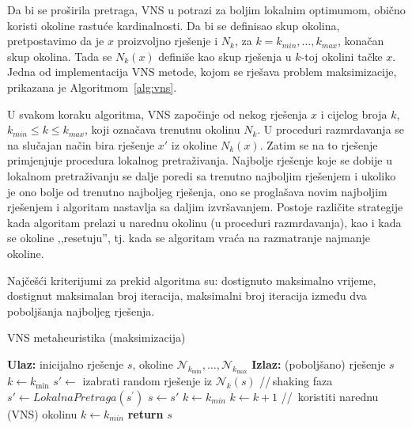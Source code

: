 \documentclass[b5paper, utf8, 11pt, colorlinks]{book}
\theoremstyle{definition}
\begin{document}
Da bi se proširila pretraga,  VNS u potrazi za boljim lokalnim optimumom, obično koristi okoline rastuće kardinalnosti. Da bi se definisao skup okolina, pretpostavimo da je $x$ proizvoljno rješenje i $N_k$, za $k=k_{min},\ldots,k_{max}$, konačan skup  okolina. Tada se  $N_k(x)$ definiše kao skup rješenja u $k$-toj okolini tačke $x$. 
 Jedna od implementacija VNS metode, kojom se rješava problem maksimizacije, prikazana je Algoritmom~\ref{alg:vns}. 


 U svakom koraku algoritma, VNS započinje od nekog rješenja $x$ i cijelog broja $k$, $k_{min}\leqslant k\leqslant k_{max}$, koji označava trenutnu okolinu $N_k$. U proceduri razmrdavanja
 se na slučajan način bira rješenje  $x'$ iz okoline  $N_k(x)$. Zatim se na to rješenje primjenjuje procedura lokalnog pretraživanja. Najbolje rješenje koje se dobije u lokalnom pretraživanju se dalje poredi sa trenutno najboljim rješenjem i ukoliko je ono bolje od trenutno najboljeg rješenja, ono se proglašava novim najboljim rješenjem i algoritam nastavlja sa daljim izvršavanjem. Postoje različite strategije kada algoritam prelazi u narednu okolinu (u proceduri razmrdavanja), kao i kada se okoline ,,resetuju'', tj. kada se algoritam vraća na razmatranje najmanje okoline. 

 Najčešći kriterijumi za prekid   algoritma su: dostignuto maksimalno  vrijeme, dostignut maksimalan broj iteracija, maksimalni broj iteracija između dva poboljšanja najboljeg rješenja. %

    \begin{algorithm}[!t] 
 	 \caption{VNS metaheuristika (maksimizacija)}\label{alg:vns}
  	\begin{algorithmic}[1]
		\STATE \textbf{Ulaz:} inicijalno rješenje $s$, okoline  $\mathcal{N}_{k_{\min}},\ldots, \mathcal{N}_{k_{\max}}$ 
		\STATE \textbf{Izlaz:} (poboljšano) rješenje $s$
		\STATE $k \gets  k_{\min}$
		\STATE  $s' \gets$ izabrati random rješenje iz $\mathcal{N}_k(s)$ \hspace{0.3cm}//\,shaking faza 
		\STATE $s' \gets  LokalnaPretraga(s^{'})$
		\STATE $s \gets s'$
		\STATE $k \gets k_{min}$
		\ELSE 
		\STATE $k \gets k+1$ \hspace{0.3cm}//\, koristiti narednu (VNS) okolinu
		\STATE $k\gets k_{min}$
		\ENDIF
		\ENDIF
		\ENDWHILE
	 	\STATE \textbf{return} $s$
 	\end{algorithmic}
 \end{algorithm}
\end{document}
